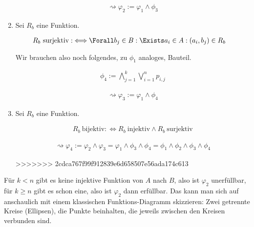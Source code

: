 \begin{solution}
\begin{enumerate}[label = \arabic*.]
  \begin{align*}
    \rightsquigarrow
    \varphi_2
    :=
    \varphi_1 \land \phi_3
  \end{align*}
  

  \item Sei $R_b$ eine Funktion.
  
  \begin{align*}
    R_b ~\text{surjektiv}
    :\iff
    & \Forall b_j \in B:
    \Exists a_i \in A:
    (a_i, b_j) \in R_b
  \end{align*}

  Wir brauchen also noch folgendes, zu $\phi_1$ analoges, Bauteil.

  \begin{align*}
    \phi_4
    :=
    \bigwedge_{j=1}^k \bigvee_{i=1}^np_{i,j}
  \end{align*}
  
  \begin{align*}
    \rightsquigarrow
    \varphi_3
    :=
    \varphi_1 \land \phi_4
  \end{align*}

  
  \item Sei $R_b$ eine Funktion.
  
  \begin{align*}
    R_b ~\text{bijektiv}
    :\iff
    R_b ~\text{injektiv}
    \land
    R_b ~\text{surjektiv}
  \end{align*}

  \begin{align*}
    \rightsquigarrow
    \varphi_4
    :=
    \varphi_2 \land \varphi_3
    =
    \varphi_1 \land \phi_3 \land \phi_4
    =
    \phi_1 \land \phi_2 \land \phi_3 \land \phi_4
  \end{align*}


>>>>>>> 2cdca767f99f912839e6d658507e56ada174c613
\end{enumerate}

Für $k < n$ gibt es keine injektive Funktion von $A$ nach $B$, also ist $\varphi_2$ unerfüllbar, für $k \geq n$ gibt es schon eine, also ist $\varphi_2$ dann erfüllbar.
Das kann man sich auf anschaulich mit einem klassischen Funktions-Diagramm skizzieren:
Zwei getrennte Kreise (Ellipsen), die Punkte beinhalten, die jeweils zwischen den Kreisen verbunden sind.

\end{solution}

